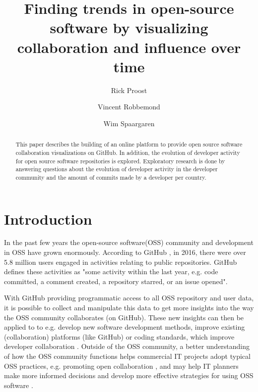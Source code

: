 \documentclass[acmtog, authorversion]{acmart}
\begin{document}
\title{Finding trends in open-source software by visualizing collaboration and influence over time} 

\author{Rick Proost}

\author{Vincent Robbemond}

\author{Wim Spaargaren}

\begin{abstract}
This paper describes the building of an online platform to provide open source software collaboration visualizations on GitHub.
In addition, the evolution of developer activity for open source software repositories is explored.
Exploratory research is done by answering questions about the evolution of developer activity in the developer community and the amount of commits made by a developer per country.
\end{abstract}


\maketitle

\section{Introduction}
In the past few years the open-source software(OSS) community and development in OSS have grown enormously.
According to GitHub \cite{GHOctoverse}, in 2016, there were over 5.8 million users engaged in activities relating to public repositories.
GitHub defines these activities as "some activity within the last year, e.g. code committed, a comment created, a repository starred, or an issue opened".

With GitHub providing programmatic access to all OSS repository and user data\cite{GHAPI}, it is possible to collect and manipulate this data to get more insights into the way the OSS community collaborates (on GitHub).
These new insights can then be applied to to e.g. develop new software development methods, improve existing (collaboration) platforms (like GitHub) or coding standards, which improve developer collaboration \cite{Jermakovics2013}.
Outside of the OSS community, a better understanding of how the OSS community functions helps commercial IT projects adopt typical OSS practices, e.g. promoting open collaboration \cite{Kalliamvakou:2015:OSC:2818754.2818825}, and may help IT planners make more informed decisions and develop more effective strategies for using OSS software \cite{madey2002}. 
\end{document}

